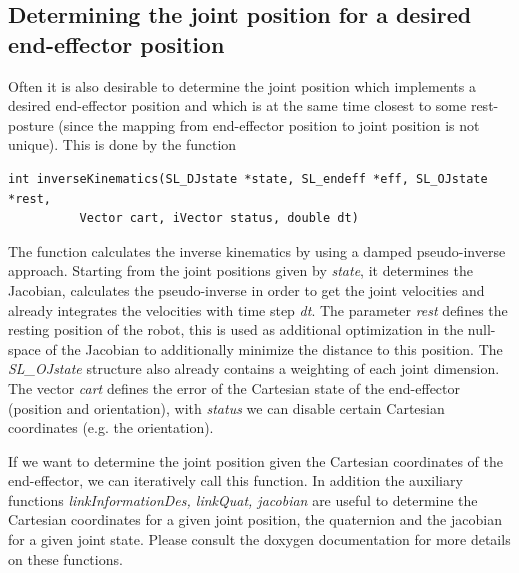 \documentclass[11pt, article, colorback]{article}
\begin{document}
\subsection{Determining the joint position for a desired end-effector position} 
Often it is also desirable to determine the joint position which implements a desired end-effector position and which is at the same time closest to some
rest-posture (since the mapping from end-effector position to joint position is not unique). This is done by the function 
\begin{lstlisting}
int inverseKinematics(SL_DJstate *state, SL_endeff *eff, SL_OJstate *rest,
		  Vector cart, iVector status, double dt)
\end{lstlisting}
The function calculates the inverse kinematics by using a damped pseudo-inverse approach. Starting from the joint positions given by {\em state}, it determines the Jacobian, calculates the pseudo-inverse in order to get the joint velocities
and already integrates the velocities with time step {\em dt}. The parameter {\em rest} defines the resting position of the robot, this is used as additional optimization in the null-space of the Jacobian to additionally minimize the distance
to this position. The {\em SL\_OJstate} structure also already contains a weighting of each joint dimension. The vector {\em cart} defines the error of the Cartesian state of the end-effector (position and orientation), with {\em status}
we can disable certain Cartesian coordinates (e.g. the orientation). 

If we want to determine the joint position  given the Cartesian coordinates of the end-effector, we can iteratively call this function. In addition the auxiliary functions {\em linkInformationDes, linkQuat, jacobian} are useful to determine the Cartesian coordinates for a given
joint position, the quaternion and the jacobian for a given joint state. Please consult the doxygen documentation for more details on these functions.
\end{document}
